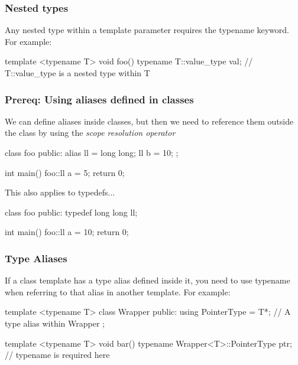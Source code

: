 \documentclass{report}
\begin{document}
     \subsubsection{Nested types}
     \bigbreak \noindent 
     Any nested type within a template parameter requires the typename keyword. For example:
     \bigbreak \noindent 
     \begin{cppcode}
         template <typename T>
         void foo() {
             typename T::value_type val; // T::value_type is a nested type within T
         }
     \end{cppcode}

     \bigbreak \noindent 
     \subsubsection{Prereq: Using aliases defined in classes}
     \bigbreak \noindent 
     We can define aliases inside classes, but then we need to reference them outside the class by using the \textit{scope resolution operator}
     \bigbreak \noindent 
     \begin{cppcode}
        class foo {
        public:
            alias ll = long long;
            ll b = 10;
         };

         int main() {
             foo::ll a = 5;
             return 0;
         }
     \end{cppcode}
     \bigbreak \noindent 
     This also applies to typedefs...
    \bigbreak \noindent 
    \begin{cppcode}
        class foo {
        public:
            typedef long long ll;
        }

        int main() {
            foo::ll a = 10;
            return 0;
        }
    \end{cppcode}

     \bigbreak \noindent 

     \bigbreak \noindent 
     \subsubsection{Type Aliases}
     \bigbreak \noindent 
     If a class template has a type alias defined inside it, you need to use typename when referring to that alias in another template. For example:
     \bigbreak \noindent 
     \begin{cppcode}
         template <typename T>
         class Wrapper {
             public:
             using PointerType = T*; // A type alias within Wrapper
         };

         template <typename T>
         void bar() {
             typename Wrapper<T>::PointerType ptr; // typename is required here
         }
     \end{cppcode}
\end{document}
